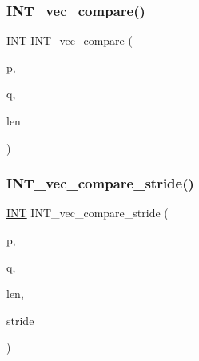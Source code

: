\mbox{\label{sorting_8_c_ac1a17fca23fb4a338aef8547a4c2fded}} 
\subsubsection{\texorpdfstring{I\+N\+T\+\_\+vec\+\_\+compare()}{INT\_vec\_compare()}}
{\footnotesize\ttfamily \mbox{\hyperlink{galois_8h_a09fddde158a3a20bd2dcadb609de11dc}{I\+NT}} I\+N\+T\+\_\+vec\+\_\+compare (\begin{DoxyParamCaption}\item[{\mbox{\hyperlink{galois_8h_a09fddde158a3a20bd2dcadb609de11dc}{I\+NT}} $\ast$}]{p,  }\item[{\mbox{\hyperlink{galois_8h_a09fddde158a3a20bd2dcadb609de11dc}{I\+NT}} $\ast$}]{q,  }\item[{\mbox{\hyperlink{galois_8h_a09fddde158a3a20bd2dcadb609de11dc}{I\+NT}}}]{len }\end{DoxyParamCaption})}

\mbox{\label{sorting_8_c_a0bd19b2461ed7cde9e3851b0da4655e3}} 
\subsubsection{\texorpdfstring{I\+N\+T\+\_\+vec\+\_\+compare\+\_\+stride()}{INT\_vec\_compare\_stride()}}
{\footnotesize\ttfamily \mbox{\hyperlink{galois_8h_a09fddde158a3a20bd2dcadb609de11dc}{I\+NT}} I\+N\+T\+\_\+vec\+\_\+compare\+\_\+stride (\begin{DoxyParamCaption}\item[{\mbox{\hyperlink{galois_8h_a09fddde158a3a20bd2dcadb609de11dc}{I\+NT}} $\ast$}]{p,  }\item[{\mbox{\hyperlink{galois_8h_a09fddde158a3a20bd2dcadb609de11dc}{I\+NT}} $\ast$}]{q,  }\item[{\mbox{\hyperlink{galois_8h_a09fddde158a3a20bd2dcadb609de11dc}{I\+NT}}}]{len,  }\item[{\mbox{\hyperlink{galois_8h_a09fddde158a3a20bd2dcadb609de11dc}{I\+NT}}}]{stride }\end{DoxyParamCaption})}

